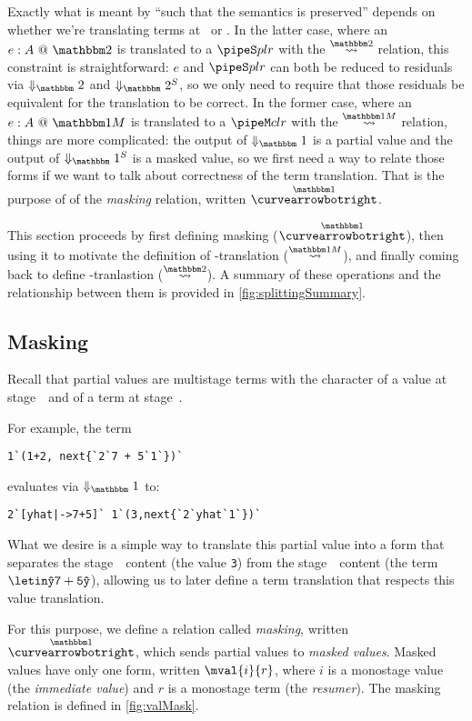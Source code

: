 \begin{abstrsyn}
Exactly what is meant by ``such that the semantics is preserved'' depends on whether we're translating
terms at \bbonem\ or \bbtwo.  
In the latter case, where an $\coltwo e A$ is translated to a $\pipeS p l r$ with the $\splittwosym$ relation,
this constraint is straightforward: $e$ and $\pipeS p l r$ can both be reduced to residuals
via $\redtwosym$ and $\sepredtwosym$, so we only need to require that those
residuals be equivalent for the translation to be correct.
In the former case, where an $\colone e A$ is translated to a $\pipeM c l r$ with the $\splitonesym$ relation, 
things are more complicated: 
the output of $\redonesym$ is a partial value and the output of $\sepredonesym$ is a masked value,
so we first need a way to relate those forms if we want to talk about correctness of the term translation.
That is the purpose of of the {\em masking} relation, written $\vsplito$.

This section proceeds by first defining masking ($\vsplito$), 
then using it to motivate the definition of \bbonem-translation ($\splitonesym$),
and finally coming back to define \bbtwo-tranlastion ($\splittwosym$).
A summary of these operations and the relationship between them is provided in \ref{fig:splittingSummary}.

\subsection{Masking}

Recall that partial values are multistage terms with the character of a value at stage~\bbone\ and of a term at stage~\bbtwo.

For example, the term
\begin{lstlisting}
1`(1+2, next{`2`7 + 5`1`})`
\end{lstlisting}
evaluates via $\redonesym$ to:
\begin{lstlisting}
2`[yhat|->7+5]` 1`(3,next{`2`yhat`1`})`
\end{lstlisting}

What we desire is a simple way to translate this partial value into a form that separates the stage~\bbone\ content (the value \texttt{3}) 
from the stage~\bbtwo\ content (the term $\letin \yhat {\mathtt{7+5}} \yhat$),
allowing us to later define a term translation that respects this value translation.

For this purpose, we define a relation called {\em masking}, written $\vsplito$, 
which sends partial values to {\em masked values}.
Masked values have only one form, written $\mval {i} {r}$, 
where $i$ is a monostage value (the {\em immediate value}) and $r$ is a monostage term (the {\em resumer}).
The masking relation is defined in \ref{fig:valMask}.


\end{abstrsyn}
